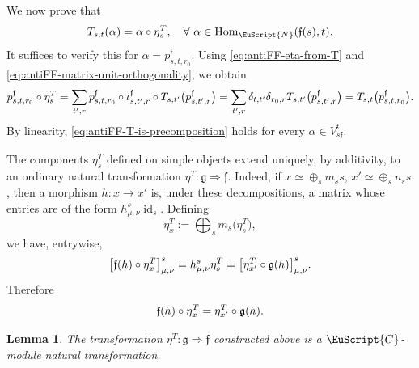 \documentclass[a4paper,11pt]{article}
\newtheorem{lemma}[theorem]{Lemma}
\theoremstyle{definition}
\theoremstyle{remark}
\newcommand\eC           {\EuScript{C}}
\newcommand\eN         {\EuScript{N}}
\newcommand{\id}{\operatorname{id}}
\begin{document}
We now prove that
\begin{equation}
    T_{s,t}(\alpha) = \alpha\circ\eta^T_s,\quad \forall~\alpha\in \operatorname{Hom}_{\eN}(\mathfrak f(s),t). 
    \label{eq:antiFF-T-is-precomposition}
\end{equation} 
It suffices to verify this for
$\alpha=p^{\mathfrak f}_{s,t,r_0}$. Using
\eqref{eq:antiFF-eta-from-T} and
\eqref{eq:antiFF-matrix-unit-orthogonality}, we obtain
\begin{equation}
    \notag
    p^{\mathfrak f}_{s,t,r_0}\circ\eta^T_s = \sum_{t',r}
    p^{\mathfrak f}_{s,t,r_0}
    \circ
    \iota^{\mathfrak f}_{s,t',r}
    \circ
    T_{s,t'}
    \bigl(p^{\mathfrak f}_{s,t',r}\bigr)
    =
    \sum_{t',r}
    \delta_{t,t'}\delta_{r_0,r}
    T_{s,t'}
    \bigl(p^{\mathfrak f}_{s,t',r}\bigr)
    =
    T_{s,t}
    \bigl(p^{\mathfrak f}_{s,t,r_0}\bigr).
\end{equation}
By linearity, \eqref{eq:antiFF-T-is-precomposition} holds for every
$\alpha\in V^t_{s\mathfrak f}$.

The components $\eta^T_s$ defined on simple objects extend uniquely,
by additivity, to an ordinary natural transformation $\eta^T:\mathfrak g\Rightarrow\mathfrak f$. 
Indeed, if $x\simeq\oplus_s m_ss$, $x'\simeq\oplus_s n_ss$, then a morphism $h:x\to x'$ is, under these decompositions, a matrix
whose entries are of the form $h^s_{\mu,\nu} \id_s$. 
Defining
\[
    \eta^T_x := \bigoplus_s m_s \bigl(\eta^T_s\bigr),
\]
we have, entrywise,
\begin{equation}
    \notag
    \bigl[
    \mathfrak f(h)\circ\eta^T_x
    \bigr]^s_{\mu,\nu}
    =
    h^s_{\mu,\nu}\eta^T_s
    =
    \bigl[
    \eta^T_{x'}\circ\mathfrak g(h)
    \bigr]^s_{\mu,\nu}. 
\end{equation}
Therefore
\begin{equation}
    \notag
    \mathfrak f(h)\circ\eta^T_x = \eta^T_{x'}\circ\mathfrak g(h). 
\end{equation}

\begin{lemma}
The transformation $\eta^T:\mathfrak g\Rightarrow\mathfrak f$ constructed above is a $\eC$-module natural transformation.
\end{lemma}
\end{document}
